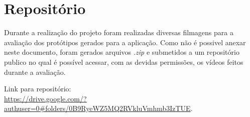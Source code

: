 \chapter[Repositório]{Repositório}
\label{chap:repositorio}
	
	Durante a realização do projeto foram realizadas diversas filmagens para a avaliação dos protótipos gerados para a aplicação. Como não é possivel anexar neste documento, foram gerados arquivos \emph{.zip} e submetidos a um repositório publico no qual é possível acessar, com as devidas permissões, os vídeos feitos durante a avaliação.

	Link para repositório:
	\\
	\url{https://drive.google.com/?authuser=0#folders/0B9RyeWZ5MQ2RVkluVmhmb3IzTUE}.

